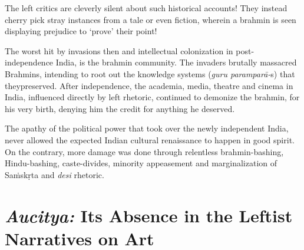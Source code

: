 The left critics are cleverly silent about such historical accounts! They instead cherry pick stray instances from a tale or even fiction, wherein a brahmin is seen displaying prejudice to ‘prove’ their point!

The worst hit by invasions then and intellectual colonization in post-independence India, is the brahmin community. The invaders brutally massacred Brahmins, intending to root out the knowledge systems (\textit{guru paramparā-}s) that theypreserved. After independence, the academia, media, theatre and cinema in India, influenced directly by left rhetoric, continued to demonize the brahmin, for his very birth, denying him the credit for anything he deserved.

The apathy of the political power that took over the newly independent India, never allowed the expected Indian cultural renaissance to happen in good spirit. On the contrary, more damage was done through relentless brahmin-bashing, Hindu-bashing, caste-divides, minority appeasement and marginalization of Saṁskṛta and \textit{desi} rhetoric.

\vspace{-.4cm}

\section*{\textit{Aucitya:} Its Absence in the Leftist Narratives on Art}

\vspace{-.2cm}


